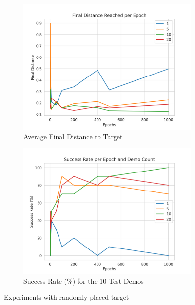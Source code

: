 \begin{figure}[htpb] %
  \begin{subfigure}{0.45\linewidth}
    \centering
    \includegraphics[scale=0.5]{assets/cam-comb/reach-no-obs/rno_random-dist.png}
    \caption{Average Final Distance to Target}\label{subfig:rno-random-dist}
  \end{subfigure}
  \hfill
  \begin{subfigure}{0.45\linewidth}
    \centering
    \includegraphics[scale=0.5]{assets/cam-comb/reach-no-obs/rno_random-success.png}
    \caption{Success Rate (\%) for the 10 Test Demos}\label{subfig:rno-random-success}
  \end{subfigure}
  \caption{Experiments with randomly placed target}\label{fig:rno-random}
\end{figure}

